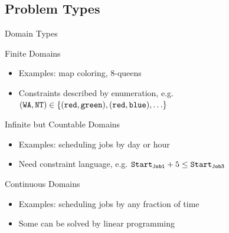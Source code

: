 \documentclass[14pt]{beamer}
\newcommand{\V}[1]{\mbox{\texttt{#1}}}
\begin{document}
\subsection{Problem Types}
\begin{frame}{Domain Types}
	\begin{block}{Finite Domains}
		\begin{itemize}
			\item Examples: map coloring, 8-queens
			\item Constraints described by enumeration, e.g. \\
			      $(\V{WA}, \V{NT}) \in \{(\V{red}, \V{green}), (\V{red}, \V{blue}), \ldots\}$
		\end{itemize}
	\end{block}
	\pause
	\begin{block}{Infinite but Countable Domains}
		\begin{itemize}
			\item Examples: scheduling jobs by day or hour
			\item Need constraint language, e.g.
			      \small $\V{Start}_{\V{\scriptsize Job1}} + 5 \leq \V{Start}_{\V{\scriptsize Job3}}$
		\end{itemize}
	\end{block}
	\pause
	\begin{block}{Continuous Domains}
		\begin{itemize}
			\item Examples: scheduling jobs by any fraction of time
			\item Some can be solved by linear programming
		\end{itemize}
	\end{block}
\end{frame}
\end{document}
